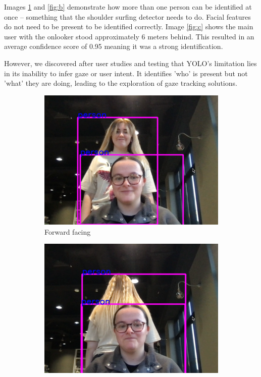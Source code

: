 \documentclass[12pt]{article}
\theoremstyle{plain}
\theoremstyle{definition}
\begin{document}
Images \ref{fig:a} and \ref{fig:b} demonstrate how more than one person can be identified at once – something that the shoulder surfing detector needs to do. Facial features do not need to be present to be identified correctly. Image \ref{fig:c} shows the main user with the onlooker stood approximately 6 meters behind. This resulted in an average confidence score of 0.95 meaning it was a strong identification.

However, we discovered after user studies and testing that YOLO's limitation lies in its inability to infer gaze or user intent. It identifies 'who' is present but not 'what' they are doing, leading to the exploration of gaze tracking solutions.

\begin{figure}[h!]
     \centering
     \begin{subfigure}[b]{0.3\textwidth}
         \centering
         \includegraphics[width=\textwidth]{img/fig1-img1.png}
         \caption{Forward facing}
         \label{fig:a}
     \end{subfigure}
     \hfill
     \begin{subfigure}[b]{0.3\textwidth}
         \centering
         \includegraphics[width=\textwidth]{img/fig1-img2.png}

\end{subfigure}
\end{figure}
\end{document}
